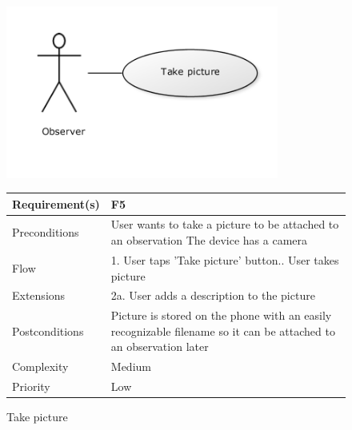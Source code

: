 \begin{figure}
		\centering
		\includegraphics[width=0.8\textwidth]{reqspec/uc/takepicture.png}
		\caption{Take picture}
		\label{fig:takepicture}

\begin{tabular}[t]{|l|p{}|}\hline
	Requirement(s)&F5\\\hline
	Preconditions&User wants to take a picture to be attached to an observation\newline
	The device has a camera\\\hline
	Flow&1. User taps 'Take picture' button.\newline
	2. User takes picture \\\hline
	Extensions& 2a. User adds a description to the picture\\\hline
	Postconditions&Picture is stored on the phone with an easily recognizable filename so it can be attached to an observation 	later\\\hline
	Complexity&Medium\\\hline
	Priority&Low\\\hline
\end{tabular}
\end{figure}


\hspace{2em}



